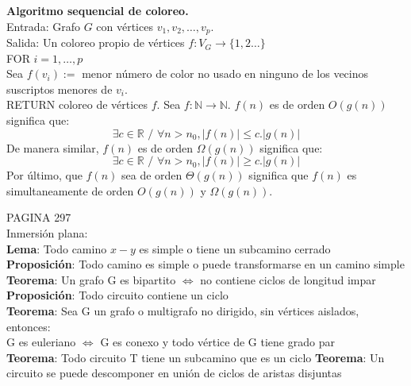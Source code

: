 \documentclass[a4paper,11pt]{report}
\begin{document}
{\bf Algoritmo sequencial de coloreo.}\\
Entrada: Grafo $G$ con vértices $v_1, v_2, \dots, v_p$.\\
Salida: Un coloreo propio de vértices $f: V_G \to \{1,2\dots\}$ \\
FOR $i=1,\dots,p$ \\
Sea $f(v_i):=$ menor número de color no usado en ninguno de los vecinos suscriptos menores de $v_i$.\\
RETURN coloreo de vértices $f$.
\newpage
\noindent
Sea $f: \mathbb{N} \to \mathbb{N}$. $f(n)$ es de orden $O(g(n))$ significa que:
$$\exists c \in \mathbb{R}\text{ / }\forall n>n_0, |f(n)| \leqslant c.|g(n)|$$
De manera similar, $f(n)$ es de orden $\Omega(g(n))$ significa que:
$$\exists c \in \mathbb{R}\text{ / }\forall n>n_0, |f(n)| \geqslant c.|g(n)|$$
Por último, que $f(n)$ sea de orden $\Theta(g(n))$ significa que $f(n)$ es simultaneamente de orden $O(g(n))$ y $\Omega(g(n))$.



\newpage
PAGINA 297 \\
Inmersión plana:\\


{\bf Lema}: Todo camino $x-y$ es simple o tiene un subcamino cerrado \\
{\bf Proposición}: Todo camino es simple o puede transformarse en un camino simple \\
{\bf Teorema}: Un grafo G es bipartito $\Leftrightarrow$ no contiene ciclos de longitud impar \\
{\bf Proposición}: Todo circuito contiene un ciclo \\
{\bf Teorema}: Sea G un grafo o multigrafo no dirigido, sin vértices aislados, entonces:\\
G es euleriano $\Leftrightarrow$ G es conexo y todo vértice de G tiene grado par \\
{\bf Teorema}: Todo circuito T tiene un subcamino que es un ciclo
{\bf Teorema}: Un circuito se puede descomponer en unión de ciclos de aristas disjuntas
\end{document}
